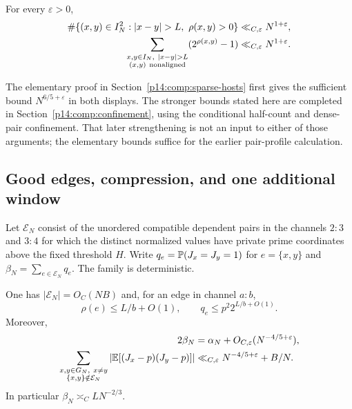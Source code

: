 \begin{proposition}\label{p1:arith:hosts}
For every $\varepsilon>0$,
\begin{align}
 \#\{(x,y)\in I_N^2:|x-y|>L,\ \rho(x,y)>0\}
   &\ll_{C,\varepsilon}N^{1+\varepsilon},
       \label{p1:arith:hostbound}\\
 \sum_{\substack{x,y\in I_N,\ |x-y|>L\\(x,y)\ {\rm nonaligned}}}
       (2^{\rho(x,y)}-1)
   &\ll_{C,\varepsilon}N^{1+\varepsilon}.
       \label{p1:arith:nonaligned}
\end{align}
\end{proposition}

The elementary proof in Section~\ref{p14:comp:sparse-hosts} first gives
the sufficient bound $N^{6/5+\varepsilon}$ in both displays.
The stronger bounds stated here are completed in
Section~\ref{p14:comp:confinement}, using the conditional half-count
and dense-pair confinement. That later strengthening is not an input
to either of those arguments; the elementary bounds suffice for the
earlier pair-profile calculation.

\subsection{Good edges, compression, and one additional window}

Let $\mathcal E_N$ consist of the unordered compatible dependent pairs in
the channels $2:3$ and $3:4$ for which the distinct normalized values have private
prime coordinates above the fixed threshold $H$.  Write
$q_e=\P(J_x=J_y=1)$ for $e=\{x,y\}$ and
$\beta_N=\sum_{e\in\mathcal E_N}q_e$.  The family is deterministic.

\begin{corollary}\label{p1:arith:edgefamily}
One has $|\mathcal E_N|=O_C(NB)$ and, for an edge in channel $a:b$,
\[
 \rho(e)\leq L/b+O(1),\qquad q_e\leq p^2 2^{L/b+O(1)}.
\]
Moreover,
\begin{align}
 2\beta_N&=\alpha_N+O_{C,\varepsilon}(N^{-4/5+\varepsilon}),
    \label{p1:arith:edgemass}\\
 \sum_{\substack{x,y\in G_N,\ x\ne y\\\{x,y\}\notin\mathcal E_N}}
   |\E[(J_x-p)(J_y-p)]|
 &\ll_{C,\varepsilon}N^{-4/5+\varepsilon}+B/N.
    \label{p1:arith:badpairs}
\end{align}
In particular $\beta_N\asymp_C LN^{-2/3}$.
\end{corollary}

